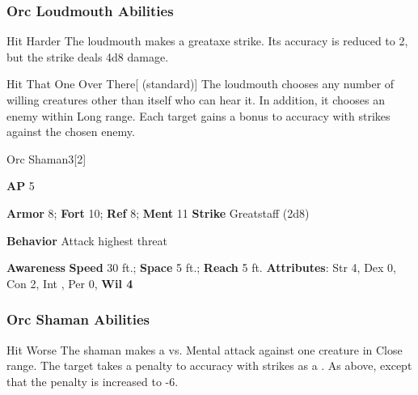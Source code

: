 \subsubsection{Orc Loudmouth Abilities}

\begin{freeability}{Hit Harder}
The loudmouth makes a greataxe strike.
Its accuracy is reduced to 2, but the strike deals 4d8 damage.
\end{freeability}

\vspace{0.5em}
\begin{freeability}{Hit That One Over There}[ (standard)]
The loudmouth chooses any number of willing creatures other than itself who can hear it.
In addition, it chooses an enemy within Long range.
Each target gains a  bonus to accuracy with strikes against the chosen enemy.
\end{freeability}

\begin{monsection}{Orc Shaman}{3}[2]
\vspace{-1em}\vspace{-1em}
\begin{spellcontent}
\begin{spelltargetinginfo}
{\textbf{AP} 5}

\pari \textbf{Armor} 8;
\textbf{Fort} 10;
\textbf{Ref} 8;
\textbf{Ment} 11
\pari \textbf{Strike} Greatstaff  (2d8)



\pari \textbf{Behavior} Attack highest threat
\end{spelltargetinginfo}
\end{spellcontent}

\begin{monsterfooter}
\pari \textbf{Awareness} 
\pari \textbf{Speed} 30 ft.;
\textbf{Space} 5 ft.;
\textbf{Reach} 5 ft.
\pari \textbf{Attributes}:
Str 4,
Dex 0,
Con 2,
Int ,
Per 0,
\textbf{Wil 4}
\end{monsterfooter}
\end{monsection}


\subsubsection{Orc Shaman Abilities}

\begin{freeability}{Hit Worse}
The shaman makes a  vs. Mental attack against one creature in Close range.
\hit The target takes a  penalty to accuracy with strikes as a .
\crit As above, except that the penalty is increased to -6.
\end{freeability}

